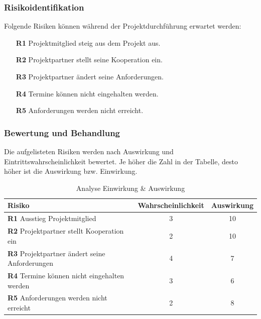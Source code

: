 \subsubsection{Risikoidentifikation}
Folgende Risiken können während der Projektdurchführung erwartet werden:
\begin{itemize}
	\item[\textbf{R1}] Projektmitglied steig aus dem Projekt aus.
	\item[\textbf{R2}] Projektpartner stellt seine Kooperation ein.
	\item[\textbf{R3}] Projektpartner ändert seine Anforderungen.
	\item[\textbf{R4}] Termine können nicht eingehalten werden.
	\item[\textbf{R5}] Anforderungen werden nicht erreicht.			
\end{itemize}

\subsubsection{Bewertung und Behandlung}
Die aufgelisteten Risiken werden nach Auswirkung und Eintrittswahrscheinlichkeit bewertet.
Je höher die Zahl in der Tabelle, desto höher ist die Auswirkung bzw. Einwirkung.
\begin{table}[h]
	\begin{tabular}{l|c|c}
		\textbf{Risiko}                           & \multicolumn{1}{l|}{\textbf{Wahrscheinlichkeit}} & \multicolumn{1}{l}{\textbf{Auswirkung}} \\ \hline
		\textbf{R1} Ausstieg Projektmitglied                  & 3                                                & 10                                      \\
		\textbf{R2} Projektpartner stellt Kooperation ein     & 2                                                & 10                                      \\
		\textbf{R3} Projektpartner ändert seine Anforderungen & 4                                                & 7                                       \\
		\textbf{R4} Termine können nicht eingehalten werden   & 3                                                & 6                                       \\
		\textbf{R5} Anforderungen werden nicht erreicht       & 2                                                & 8                                      
	\end{tabular}
	\caption{Analyse Einwirkung \& Auswirkung}
	\label{Abb_Einwirkung_Auswirkung}
\end{table}
\newpage


